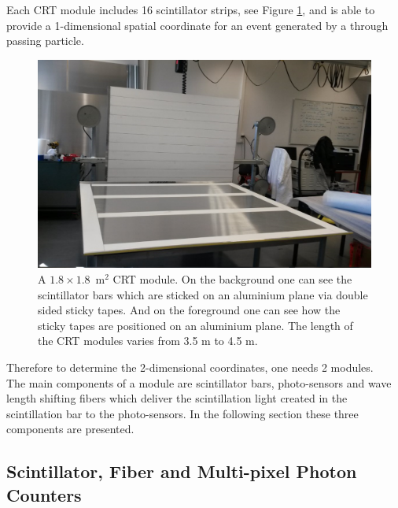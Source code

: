 \documentclass[a4paper]{article}\linespread{1.4}
\begin{document}
Each CRT module includes 16 scintillator strips, see Figure \ref{fig:tapes}, and is able to provide a 1-dimensional spatial coordinate for an event generated by a through passing particle.%
\begin{figure}[h!] \centering \includegraphics[width=120mm,scale=2.0]{figures/tapespaint.png} \caption{A $1.8\times 1.8$~$\mathrm{m^{2}}$ CRT module. On the background one can see the scintillator bars which are sticked on an aluminium plane via double sided sticky tapes. And on the foreground one can see how the sticky tapes are positioned on an aluminium plane. The length of the CRT modules varies from 3.5 m to 4.5 m.}  \label{fig:tapes}\end{figure}
Therefore to determine the 2-dimensional coordinates, one needs 2 modules. 
\\The main components of a module are scintillator bars, photo-sensors and wave length shifting fibers which deliver the scintillation light created in the scintillation bar to the photo-sensors. In the following section these three components are presented.

\subsection{Scintillator, Fiber and Multi-pixel Photon Counters}
\label{chap:scifib}
\end{document}
